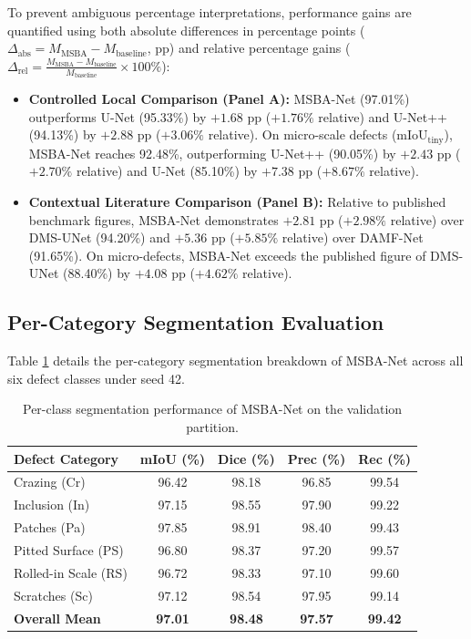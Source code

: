 \documentclass{ieeeaccess}
\begin{document}
To prevent ambiguous percentage interpretations, performance gains are quantified using both absolute differences in percentage points ($\Delta_{\text{abs}} = M_{\text{MSBA}} - M_{\text{baseline}}$, pp) and relative percentage gains ($\Delta_{\text{rel}} = \frac{M_{\text{MSBA}} - M_{\text{baseline}}}{M_{\text{baseline}}} \times 100\%$):
\begin{itemize}
    \item \textbf{Controlled Local Comparison (Panel A):} MSBA-Net (97.01\%) outperforms U-Net (95.33\%) by $+1.68\text{ pp}$ ($+1.76\%$ relative) and U-Net++ (94.13\%) by $+2.88\text{ pp}$ ($+3.06\%$ relative). On micro-scale defects ($\text{mIoU}_{\text{tiny}}$), MSBA-Net reaches 92.48\%, outperforming U-Net++ (90.05\%) by $+2.43\text{ pp}$ ($+2.70\%$ relative) and U-Net (85.10\%) by $+7.38\text{ pp}$ ($+8.67\%$ relative).
    \item \textbf{Contextual Literature Comparison (Panel B):} Relative to published benchmark figures, MSBA-Net demonstrates $+2.81\text{ pp}$ ($+2.98\%$ relative) over DMS-UNet (94.20\%) and $+5.36\text{ pp}$ ($+5.85\%$ relative) over DAMF-Net (91.65\%). On micro-defects, MSBA-Net exceeds the published figure of DMS-UNet (88.40\%) by $+4.08\text{ pp}$ ($+4.62\%$ relative).
\end{itemize}

\subsection{Per-Category Segmentation Evaluation}
Table \ref{tab:classwise} details the per-category segmentation breakdown of MSBA-Net across all six defect classes under seed 42.

\begin{table}[!t]
\centering
\setlength{\tabcolsep}{3.5pt}
\fontsize{7.5pt}{9.5pt}\selectfont
\caption{Per-class segmentation performance of MSBA-Net on the validation partition.}
\label{tab:classwise}
\begin{tabular*}{\columnwidth}{@{\extracolsep{\fill}}lcccc@{}}
\toprule
\textbf{Defect Category} & \textbf{mIoU (\%)} & \textbf{Dice (\%)} & \textbf{Prec (\%)} & \textbf{Rec (\%)} \\
\midrule
Crazing (Cr) & 96.42 & 98.18 & 96.85 & 99.54 \\
Inclusion (In) & 97.15 & 98.55 & 97.90 & 99.22 \\
Patches (Pa) & 97.85 & 98.91 & 98.40 & 99.43 \\
Pitted Surface (PS) & 96.80 & 98.37 & 97.20 & 99.57 \\
Rolled-in Scale (RS) & 96.72 & 98.33 & 97.10 & 99.60 \\
Scratches (Sc) & 97.12 & 98.54 & 97.95 & 99.14 \\
\midrule
\textbf{Overall Mean} & \textbf{97.01} & \textbf{98.48} & \textbf{97.57} & \textbf{99.42} \\
\bottomrule
\end{tabular*}
\end{table}
\end{document}
